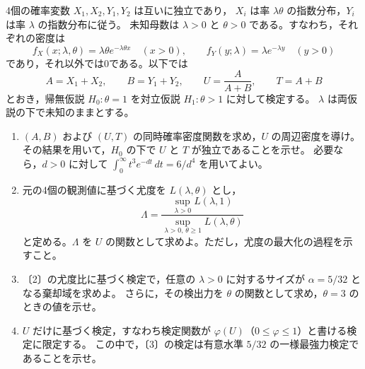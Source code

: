 \documentclass[a4paper,11pt]{ltjsarticle}
\begin{document}
4個の確率変数 $X_1,X_2,Y_1,Y_2$ は互いに独立であり，
$X_i$ は率 $\lambda\theta$ の指数分布，$Y_i$ は率 $\lambda$ の指数分布に従う。
未知母数は $\lambda>0$ と $\theta>0$ である。すなわち，それぞれの密度は
\[
f_X(x;\lambda,\theta)=\lambda\theta e^{-\lambda\theta x}\quad(x>0),
\qquad
f_Y(y;\lambda)=\lambda e^{-\lambda y}\quad(y>0)
\]
であり，それ以外では0である。以下では
\[
A=X_1+X_2,\qquad B=Y_1+Y_2,\qquad
U=\frac{A}{A+B},\qquad T=A+B
\]
とおき，帰無仮説 $H_0:\theta=1$ を対立仮説 $H_1:\theta>1$ に対して検定する。
$\lambda$ は両仮説の下で未知のままとする。
\begin{enumerate}
\item $(A,B)$ および $(U,T)$ の同時確率密度関数を求め，$U$ の周辺密度を導け。
その結果を用いて，$H_0$ の下で $U$ と $T$ が独立であることを示せ。
必要なら，$d>0$ に対して $\int_0^\infty t^3e^{-dt}\,dt=6/d^4$ を用いてよい。
\item 元の4個の観測値に基づく尤度を $L(\lambda,\theta)$ とし，
\[
\Lambda=
\frac{\displaystyle\sup_{\lambda>0}L(\lambda,1)}
{\displaystyle\sup_{\lambda>0,\,\theta\geq1}L(\lambda,\theta)}
\]
と定める。$\Lambda$ を $U$ の関数として求めよ。ただし，尤度の最大化の過程を示すこと。
\item 〔2〕の尤度比に基づく検定で，任意の $\lambda>0$ に対するサイズが
$\alpha=5/32$ となる棄却域を求めよ。
さらに，その検出力を $\theta$ の関数として求め，$\theta=3$ のときの値を示せ。
\item $U$ だけに基づく検定，すなわち検定関数が $\varphi(U)$（$0\leq\varphi\leq1$）と書ける検定に限定する。
この中で，〔3〕の検定は有意水準 $5/32$ の一様最強力検定であることを示せ。
\end{enumerate}
\newpage
\end{document}
